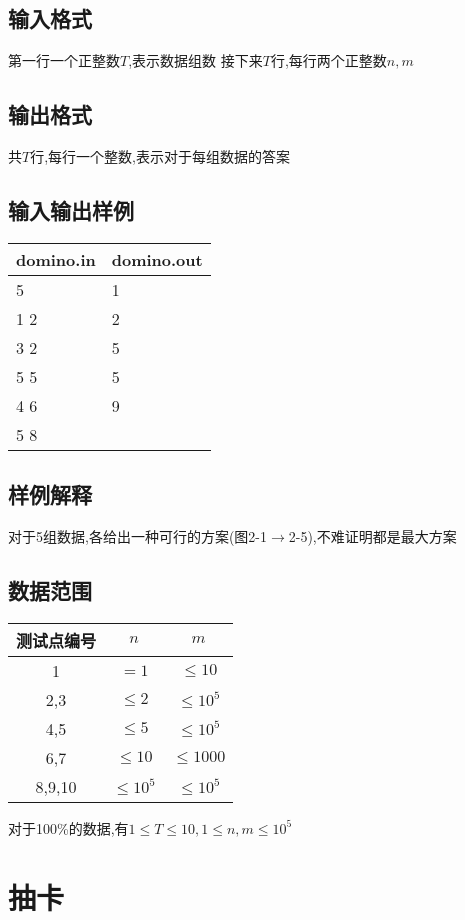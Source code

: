 \documentclass[12pt]{ctexart}
\begin{document}
\subsection{输入格式}
第一行一个正整数$T$,表示数据组数
接下来$T$行,每行两个正整数$n,m$
\subsection{输出格式}
共$T$行,每行一个整数,表示对于每组数据的答案
\subsection{输入输出样例}
\begin{center}
	\begin{tabular}{|p{6cm}|p{6cm}|}
		\hline domino.in&domino.out\\
		\hline	5&1\\
				1 2&2\\
				3 2&5\\
				5 5&5\\
				4 6&9\\
				5 8&\\
		\hline
	\end{tabular}
\end{center}
\subsection{样例解释}
对于5组数据,各给出一种可行的方案(图2-1$\to$2-5),不难证明都是最大方案
\subsection{数据范围}
\begin{center}
	\begin{tabular}{|c|c|c|}
		\hline 测试点编号&$n$&$m$\\
		\hline 1&$=1$&$\le10$\\
		\hline 2,3&$\le2$&$\le10^5$\\
		\hline 4,5&$\le5$&$\le10^5$\\
		\hline 6,7&$\le10$&$\le1000$\\
		\hline 8,9,10&$\le10^5$&$\le10^5$\\
		\hline
	\end{tabular}
\end{center}
对于100\%的数据,有$1\le T\le10,1\le n,m\le10^5$
\newpage
\section{抽卡}
\end{document}
